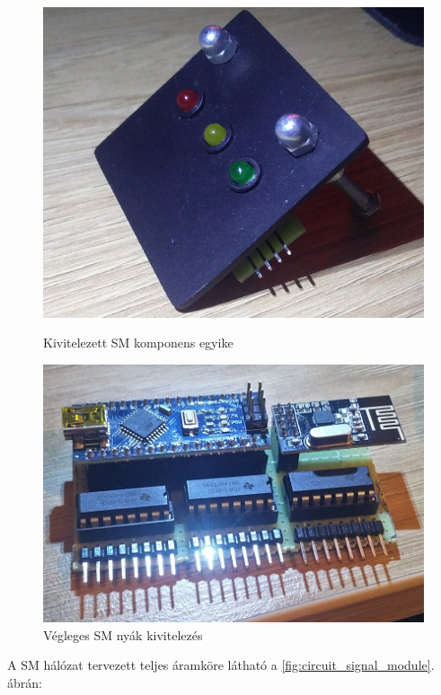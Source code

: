 \documentclass[a4paper,12pt]{article}
\begin{document}
\begin{figure}[htp]
	\centering
	\begin{minipage}{0.5\textwidth}
		\centering
		\includegraphics[width=0.75\linewidth]{images/SMelement.png}
		\caption[Egy SM komponens]{Kivitelezett SM komponens egyike}
		\label{fig:SMelement}
	\end{minipage}\hfill
	\begin{minipage}{0.45\textwidth}
		\centering
		\includegraphics[width=0.9\linewidth]{images/SMDBMCRFT.png}
		\caption[SM implementáció]{Végleges SM nyák kivitelezés}
		\label{fig:SMDBMCRFT}
	\end{minipage}
\end{figure}

A SM hálózat tervezett teljes áramköre látható a \ref{fig:circuit_signal_module}. ábrán:
\end{document}
